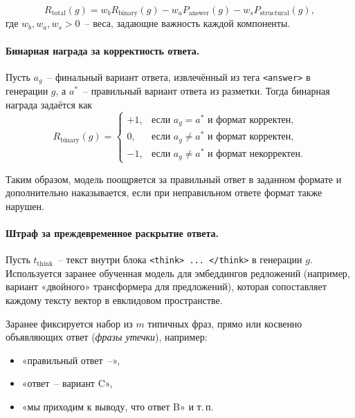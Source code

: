 \begin{equation}
    R_{\text{total}}(g) = w_b R_{\text{binary}}(g) 
    - w_a P_{\text{answer}}(g) 
    - w_s P_{\text{structural}}(g),
\end{equation}
где $w_b, w_a, w_s > 0$~-- веса, задающие важность каждой компоненты.

\paragraph{Бинарная награда за корректность ответа.}

Пусть $a_g$~-- финальный вариант ответа, извлечённый из тега \verb|<answer>| 
в генерации $g$, а $a^*$~-- правильный вариант ответа из разметки. Тогда 
бинарная награда задаётся как
\begin{equation}
R_{\text{binary}}(g)
=
\begin{cases}
+1, & \text{если } a_g = a^* \text{ и формат корректен},\\
0,  & \text{если } a_g \neq a^* \text{ и формат корректен},\\
-1, & \text{если } a_g \neq a^* \text{ и формат некорректен}.
\end{cases}
\end{equation}

Таким образом, модель поощряется за правильный ответ в заданном формате и 
дополнительно наказывается, если при неправильном ответе формат также нарушен.

\paragraph{Штраф за преждевременное раскрытие ответа.}

Пусть $t_{\text{think}}$~-- текст внутри блока \verb|<think> ... </think>| 
в генерации $g$. Используется заранее обученная модель для эмбеддингов 
редложений (например, вариант «двойного» трансформера для предложений), 
которая сопоставляет каждому тексту вектор в евклидовом пространстве.

Заранее фиксируется набор из $m$ типичных фраз, прямо или косвенно 
объявляющих ответ (\emph{фразы утечки}), например:
\begin{itemize}
    \item «правильный ответ~--»,
    \item «ответ~-- вариант C»,
    \item «мы приходим к выводу, что ответ B» и т.\,п.
\end{itemize}

